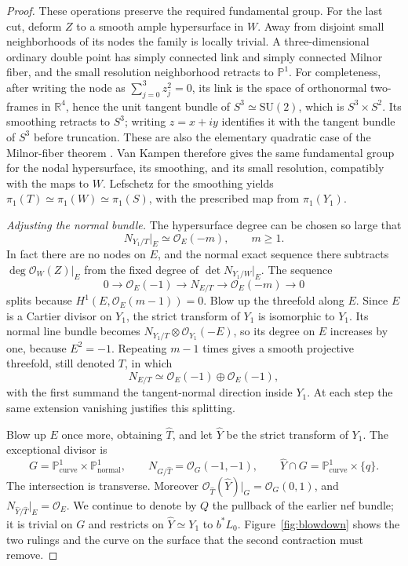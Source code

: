 \documentclass[11pt,reqno]{amsart}
\numberwithin{equation}{section}
\theoremstyle{definition}
\theoremstyle{remark}
\begin{document}
\begin{proof}
These operations preserve the required fundamental group.  For the
last cut, deform $Z$ to a smooth ample hypersurface in $W$.  Away from
disjoint small neighborhoods of its nodes the family is locally
trivial.  A three-dimensional ordinary double point has simply
connected link and simply connected Milnor fiber, and the small
resolution neighborhood retracts to $\mathbb P^1$.  For completeness, after
writing the node as $\sum_{j=0}^3 z_j^2=0$, its link is the space of
orthonormal two-frames in $\mathbb R^4$, hence the unit tangent bundle of
$S^3\simeq\mathrm{SU}(2)$, which is $S^3\times S^2$.  Its smoothing
retracts to $S^3$; writing $z=x+iy$ identifies it with the tangent
bundle of $S^3$ before truncation.  These are also the elementary
quadratic case of the Milnor-fiber theorem \cite{MilnorSingular}.
Van Kampen therefore gives the same fundamental group for the nodal
hypersurface, its smoothing, and its small resolution, compatibly with
the maps to $W$.  Lefschetz for the smoothing yields
$\pi_1(T)\simeq\pi_1(W)\simeq\pi_1(S)$, with the prescribed map
from $\pi_1(Y_1)$.

 
 \emph{Adjusting the normal bundle.}
The hypersurface degree can be chosen so large that
\[
 N_{Y_1/T}|_E\simeq\mathcal O_E(-m),\qquad m\ge1.
\]
In fact there are no nodes on $E$, and the normal exact sequence there
subtracts $\deg\mathcal O_W(Z)|_E$ from the fixed degree of
$\det N_{Y_1/W}|_E$.  The sequence
\[
 0\longrightarrow\mathcal O_E(-1)
 \longrightarrow N_{E/T}
 \longrightarrow\mathcal O_E(-m)\longrightarrow0
\]
splits because
$H^1(E,\mathcal O_E(m-1))=0$.  Blow up the threefold along $E$.
Since $E$ is a Cartier divisor on $Y_1$, the strict transform of $Y_1$
is isomorphic to $Y_1$.  Its normal line bundle becomes
$N_{Y_1/T}\otimes\mathcal O_{Y_1}(-E)$, so its degree on $E$ increases
by one, because $E^2=-1$.  Repeating $m-1$ times gives a smooth
projective threefold, still denoted $T$, in which
\[
 N_{E/T}\simeq\mathcal O_E(-1)\oplus\mathcal O_E(-1),
\]
with the first summand the tangent-normal direction inside $Y_1$.
At each step the same extension vanishing justifies this splitting.

Blow up $E$ once more, obtaining $\widehat T$, and let $\widehat Y$
be the strict transform of $Y_1$.  The exceptional divisor is
\begin{equation}\label{proj:exceptional-quadric}
 G=\mathbb P^1_{\mathrm{curve}}\times\mathbb P^1_{\mathrm{normal}},\qquad
 N_{G/\widehat T}=\mathcal O_G(-1,-1),\qquad
 \widehat Y\cap G=\mathbb P^1_{\mathrm{curve}}\times\{q\}.
\end{equation}
The intersection is transverse.  Moreover
$\mathcal O_{\widehat T}(\widehat Y)|_G=\mathcal O_G(0,1)$, and
$N_{\widehat Y/\widehat T}|_E=\mathcal O_E$.
We continue to denote by $Q$ the pullback of the earlier nef bundle;
it is trivial on $G$ and restricts on $\widehat Y\simeq Y_1$ to
$b^*L_0$.  Figure~\ref{fig:blowdown} shows the two rulings and the
curve on the surface that the second contraction must remove.


\end{proof}
\end{document}
